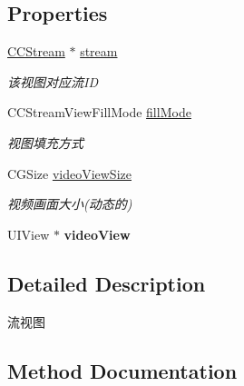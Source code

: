 \subsection*{Properties}
\begin{DoxyCompactItemize}
\item 
\mbox{\label{interface_c_c_stream_view_a258b3c6eef0d353d7bca24e4f61f7f78}} 
\hyperlink{interface_c_c_stream}{C\+C\+Stream} $\ast$ \hyperlink{interface_c_c_stream_view_a258b3c6eef0d353d7bca24e4f61f7f78}{stream}
\begin{DoxyCompactList}\small\item\em 该视图对应流\+ID \end{DoxyCompactList}\item 
\mbox{\label{interface_c_c_stream_view_aff0922102b8ef404e6968887efc4388a}} 
C\+C\+Stream\+View\+Fill\+Mode \hyperlink{interface_c_c_stream_view_aff0922102b8ef404e6968887efc4388a}{fill\+Mode}
\begin{DoxyCompactList}\small\item\em 视图填充方式 \end{DoxyCompactList}\item 
\mbox{\label{interface_c_c_stream_view_a26608e3bfad777afca8b2566ee71f21b}} 
C\+G\+Size \hyperlink{interface_c_c_stream_view_a26608e3bfad777afca8b2566ee71f21b}{video\+View\+Size}
\begin{DoxyCompactList}\small\item\em 视频画面大小(动态的) \end{DoxyCompactList}\item 
\mbox{\label{interface_c_c_stream_view_a76413209ee4b57512e0df74ecddd4a71}} 
U\+I\+View $\ast$ {\bfseries video\+View}
\end{DoxyCompactItemize}


\subsection{Detailed Description}
流视图 

\subsection{Method Documentation}
\mbox{\label{interface_c_c_stream_view_a278f8570e685cb68c278ab47c631f9c9}} 
